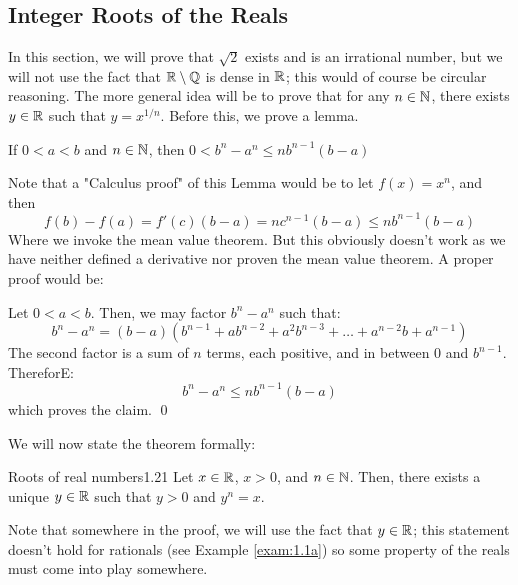 \subsection{Integer Roots of the Reals}
In this section, we will prove that $\sqrt{2}$ exists and is an irrational number, but we will not use the fact that $\mathbb{R} \setminus \mathbb{Q}$ is dense in $\mathbb{R}$; this would of course be circular reasoning. The more general idea will be to prove that for any $n \in \mathbb{N}$, there exists $y \in \mathbb{R}$ such that $y = x^{1/n}$. Before this, we prove a lemma.
\begin{nlemma}{}
    If $0 < a < b$ and $n \in \mathbb{N}$, then $0 < b^n - a^n \leq nb^{n-1}(b-a)$
\end{nlemma}
Note that a "Calculus proof" of this Lemma would be to let $f(x) = x^n$, and then
\[f(b) - f(a) = f'(c)(b-a) = nc^{n-1}(b-a) \leq nb^{n-1}(b-a)\]
Where we invoke the mean value theorem. But this obviously doesn't work as we have neither defined a derivative nor proven the mean value theorem. A proper proof would be:
\begin{nproof}
    Let $0 < a < b$. Then, we may factor $b^n - a^n$ such that:
    \[b^n - a^n = (b-a)(b^{n-1} + ab^{n-2} + a^2b^{n-3} + \ldots + a^{n-2}b + a^{n-1})\]
    The second factor is a sum of $n$ terms, each positive, and in between $0$ and $b^{n-1}$. ThereforE:
    \[b^n - a^n \leq nb^{n-1}(b-a)\]
    which proves the claim. \qed
\end{nproof}
We will now state the theorem formally:
\begin{theorem}{Roots of real numbers}{1.21}
    Let $x \in \mathbb{R}$, $x > 0$, and $n \in \mathbb{N}$. Then, there exists a unique $y \in \mathbb{R}$ such that $y > 0$ and $y^n = x$. 
\end{theorem}
Note that somewhere in the proof, we will use the fact that $y \in \mathbb{R}$; this statement doesn't hold for rationals (see Example \ref{exam:1.1a}) so some property of the reals must come into play somewhere.
